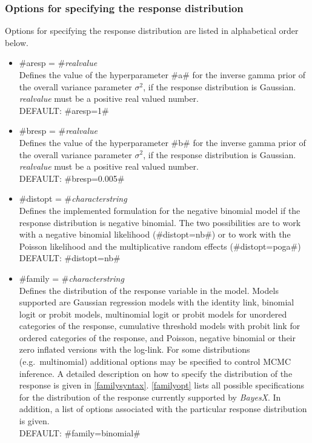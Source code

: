 \subsubsection*{Options for specifying the response distribution}

Options for specifying the response distribution are listed in
alphabetical order below.


\begin{itemize}
\item #aresp = #{\em realvalue } \\
Defines the value of the hyperparameter #a# for the inverse gamma
prior of the overall variance parameter $\sigma^2$, if the
response distribution is Gaussian.
{\em realvalue} must be a positive real valued number. \\
DEFAULT: #aresp=1#

\item #bresp = #{\em realvalue } \\
Defines the value of the hyperparameter #b# for the inverse gamma
prior of the overall variance parameter $\sigma^2$, if the
response distribution is Gaussian.
{\em realvalue} must be a positive real valued number. \\
DEFAULT: #bresp=0.005#

\item #distopt = #{\em characterstring} \\
Defines the implemented formulation for the negative binomial
model if the response distribution is negative binomial. The two
possibilities are to work with a negative binomial likelihood
(#distopt=nb#) or to work with the
Poisson likelihood and the multiplicative random effects (#distopt=poga#)\\
DEFAULT: #distopt=nb#


\item #family = #{\em characterstring } \\
Defines the distribution of the response variable in the model.
Models supported are Gaussian regression models with the identity
link, binomial logit or probit models, multinomial logit or probit
models for unordered categories of the response, cumulative
threshold models with probit link for ordered categories of the
response, and Poisson, negative binomial or their zero inflated
versions with the log-link. For some distributions
(e.g.~multinomial) additional options may be specified to control
MCMC inference. A detailed description on how to specify the
distribution of the response is given in \autoref{familysyntax}.
\autoref{familyopt} lists all possible specifications for the
distribution of the response currently supported by {\em BayesX}. In
addition, a list of options associated
with the particular response distribution is given. \\
DEFAULT: #family=binomial#


\end{itemize}
